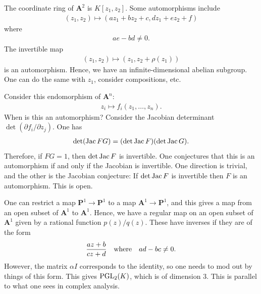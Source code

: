\documentclass [11 pt, oneside] {article}
\begin{document}
\begin{example}\label{}
The coordinate ring of $\mathbf{A}^2$ is $K[z_1,z_2]$. Some automorphisms include 
\begin{align*}
	(z_1,z_2)\longmapsto (az_1+bz_2+c, dz_1+ez_2+f) 
\end{align*}
where
\begin{align*}
	ae - bd \ne 0.
\end{align*}
The invertible map
\begin{align*}
	(z_1,z_2)\longmapsto  (z_1,z_2+\rho(z_1))
\end{align*}
is an automorphism. Hence, we have an infinite-dimensional abelian subgroup. One can do the same with $z_1$, consider compositions, etc. 
\end{example}

\begin{example}\label{}
Consider this endomorphism of $\mathbf{A}^n$:
\begin{align*}
	z_i\longmapsto f_i(z_1,\hdots, z_n).
\end{align*}
When is this an automorphism? Consider the Jacobian determinant $\det (\partial f_i/\partial z_j)$. One has
\begin{align*}
	\det (\operatorname{Jac} FG) =  (\det \operatorname{Jac} F) (\det \operatorname{Jac} G).
\end{align*}
Therefore, if $FG = 1$, then $\det\operatorname{Jac} F$ is invertible. One conjectures that this is an automorphism if and only if the Jacobian is invertible. One direction is trivial, and the other is the Jacobian conjecture: If $\det \operatorname{Jac} F$ is invertible then $F$ is an automorphism. This is open.
\end{example}

\begin{example}\label{}
One can restrict a map $\mathbf{P}^1\longrightarrow \mathbf{P}^1$ to a map $\mathbf{A}^1\longrightarrow \mathbf{P}^1$, and this gives a map from an open subset of $\mathbf{A}^1$ to $\mathbf{A}^1$. Hence, we have a regular map on an open subset of $\mathbf{A}^1$ given by a rational function $p(z)/q (z)$. These have inverses if they are of the form
\begin{align*}
	\frac{az+b}{cz+d}\textrm{\quad where\quad$ad - bc \ne 0$.}
\end{align*}
However, the matrix $\alpha I$ corresponds to the identity, so one needs to mod out by things of this form. This gives $\operatorname{PGL}_2(K)$, which is of dimension $3$. This is parallel to what one sees in complex analysis.
\end{example}
\end{document}
